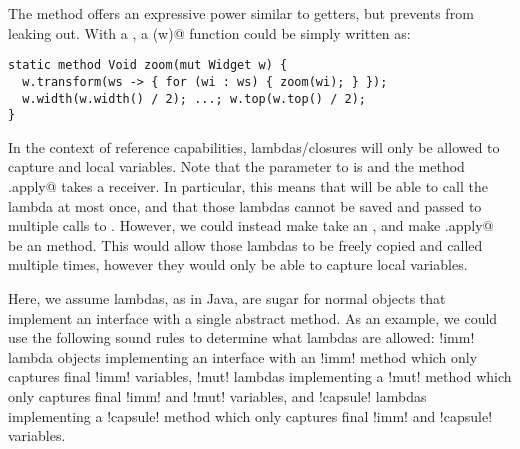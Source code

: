 The \Q@transform@ method offers an expressive power similar to \Q@mut@ getters, but prevents \Q@Widgets@ from leaking out.  With a \Q@Transformer@, a \Q@zoom(w)@ function could be simply written as:
\begin{lstlisting}
static method Void zoom(mut Widget w) {
  w.transform(ws -> { for (wi : ws) { zoom(wi); } });
  w.width(w.width() / 2); ...; w.top(w.top() / 2); 
}
\end{lstlisting}

In the context of reference capabilities, \Q@capsule@ lambdas/closures will only be allowed to capture \Q@imm@ and \Q@capsule@ local variables.
Note that the \Q@Transformer@ parameter to \Q@transform@ is \Q@capsule@ and the method \Q@Trasformer.apply@ takes a \Q@capsule@ receiver. In particular, this means that \Q@transform@ will be able to call the lambda at most once,
and that those lambdas cannot be saved and passed to multiple calls to \Q@transform@.
However, we could instead make \Q@transform@ take an \Q@imm@ \Q@Transformer@, and make \Q@Transformer.apply@ be an \Q@imm@ method. This would allow those lambdas to be freely copied and called multiple times, however they would only be able to capture \Q@imm@ local variables.

Here, we assume lambdas, as in Java, are sugar for normal objects that implement an interface with a single abstract method.
As an example, we could use the following sound rules to determine what lambdas are allowed:
\Q!imm! lambda objects implementing an interface with an \Q!imm! method which only captures final \Q!imm! variables,
\Q!mut! lambdas implementing a \Q!mut! method which only captures final \Q!imm! and \Q!mut! variables,
and \Q!capsule! lambdas implementing a \Q!capsule! method which only captures final \Q!imm! and \Q!capsule! variables.



